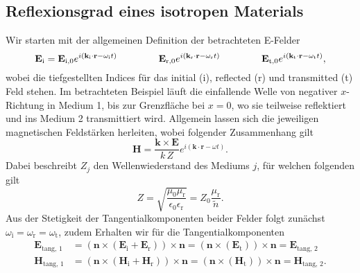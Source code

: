 \subsection{\label{subsec:FZV3}Reflexionsgrad eines isotropen Materials}
Wir starten mit der allgemeinen Definition der betrachteten E-Felder
\begin{equation}
    \mathbf{E}_{\text{i}} = \mathbf{E}_{\text{i},0}e^{i\left(\mathbf{k}_{\text{i}}\cdot \mathbf{r}-\omega_{\text{i}} t\right)}
    \hspace{1.5cm}\mathbf{E}_{\text{r},0}e^{i\left(\mathbf{k}_{\text{r}}\cdot \mathbf{r}-\omega_{\text{r}} t\right)}
    \hspace{1.5cm}\mathbf{E}_{\text{t},0}e^{i\left(\mathbf{k}_{\text{t}}\cdot \mathbf{r}-\omega_{\text{t}} t\right)},
\end{equation}
wobei die tiefgestellten Indices für das initial (i), reflected (r) und transmitted (t)
Feld stehen. 
Im betrachteten Beispiel läuft die einfallende Welle von negativer $x$-Richtung in Medium 1, bis zur Grenzfläche 
bei $x=0$, wo sie teilweise reflektiert und ins Medium 2 transmittiert wird.  
Allgemein lassen sich die jeweiligen magnetischen Feldstärken herleiten, wobei folgender 
Zusammenhang gilt
\begin{equation}
    \mathbf{H} = \frac{\mathbf{k}\times \mathbf{E}}{k\,Z}e^{i\left(\mathbf{k}\cdot \mathbf{r}-\omega t\right)}.
\end{equation}
Dabei beschreibt $Z_{j}$ den Wellenwiederstand des Mediums $j$, für welchen folgenden gilt
\begin{equation}\label{eq:wellwi}
    Z = \sqrt{\frac{\mu_{0}\mu_{\text{r}}}{\epsilon_{0}\epsilon_{\text{r}}}} = Z_{0}\frac{\mu_{\text{r}}}{\tilde{n}}.
\end{equation}
Aus der Stetigkeit der Tangentialkomponenten beider Felder folgt zunächst 
$\omega_{\text{i}} = \omega_{\text{r}} = \omega_{\text{t}}$, zudem Erhalten wir für die Tangentialkomponenten
\begin{align}
    \mathbf{E}_{\text{tang, 1}} &= \left(\mathbf{n}\times\left(\mathbf{E}_{\text{i}} + \mathbf{E}_{\text{r}}\right)\right)\times \mathbf{n} 
    = \left(\mathbf{n}\times\left(\mathbf{E}_{\text{t}}\right)\right)\times \mathbf{n} = \mathbf{E}_{\text{tang, 2}} \label{eq:stet1}\\
    \mathbf{H}_{\text{tang, 1}} &= \left(\mathbf{n}\times\left(\mathbf{H}_{\text{i}} + \mathbf{H}_{\text{r}}\right)\right)\times \mathbf{n} 
    = \left(\mathbf{n}\times\left(\mathbf{H}_{\text{t}}\right)\right)\times \mathbf{n} = \mathbf{H}_{\text{tang, 2}}. \label{eq:stet2}
\end{align}

